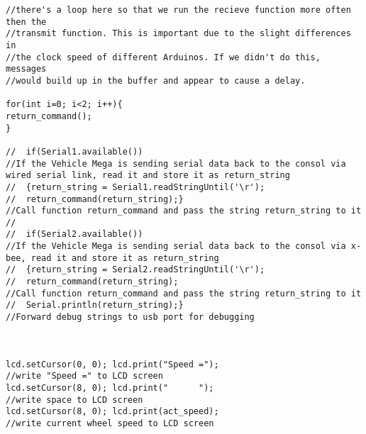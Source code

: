 \begin{lstlisting}[breaklines=true,basicstyle=\tiny]
//there's a loop here so that we run the recieve function more often then the 
//transmit function. This is important due to the slight differences in 
//the clock speed of different Arduinos. If we didn't do this, messages 
//would build up in the buffer and appear to cause a delay.

for(int i=0; i<2; i++){
return_command(); 
}

//  if(Serial1.available())                                                              //If the Vehicle Mega is sending serial data back to the consol via wired serial link, read it and store it as return_string
//  {return_string = Serial1.readStringUntil('\r');
//  return_command(return_string);}                                                      //Call function return_command and pass the string return_string to it
//  
//  if(Serial2.available())                                                              //If the Vehicle Mega is sending serial data back to the consol via x-bee, read it and store it as return_string
//  {return_string = Serial2.readStringUntil('\r');
//  return_command(return_string);                                                        //Call function return_command and pass the string return_string to it
//  Serial.println(return_string);}                                                      //Forward debug strings to usb port for debugging



lcd.setCursor(0, 0); lcd.print("Speed =");                                                                      //write "Speed =" to LCD screen
lcd.setCursor(8, 0); lcd.print("      ");                                                                       //write space to LCD screen
lcd.setCursor(8, 0); lcd.print(act_speed);                                                                      //write current wheel speed to LCD screen


\end{lstlisting}
